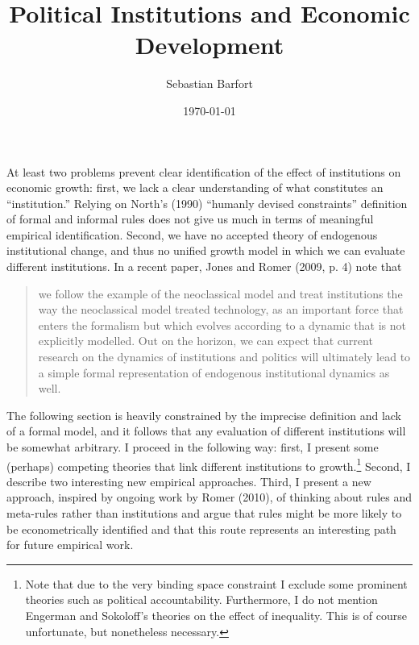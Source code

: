 \documentclass[12pt]{article}%
\begin{document}
\title{Political Institutions and Economic Development }
\author{Sebastian Barfort\medskip\\{\normalsize} \date{\normalsize \today}}
\maketitle

\sloppy




\strut


\thispagestyle{empty}

\pagebreak%

\singlespacing

\section{}
At least two problems prevent clear identification of the effect of institutions on economic growth: first, we lack a clear understanding of what constitutes an ``institution.'' Relying on North's (1990) ``humanly devised constraints'' definition of formal and informal rules does not give us much in terms of meaningful empirical identification. Second, we have no accepted theory of endogenous institutional change, and thus no unified growth model in which we can evaluate different institutions. In a recent paper, Jones and Romer (2009, p. 4) note that 
\begin{quote}
we follow the example of the neoclassical model and treat institutions the way the neoclassical model treated technology, as an important force that enters the formalism but which evolves according to a dynamic that is not explicitly modelled. Out on the horizon, we can expect that current research on the dynamics of institutions and politics will ultimately lead to a simple formal representation of endogenous institutional dynamics as well.
\end{quote}

The following section is heavily constrained by the imprecise definition and lack of a formal model, and it follows that any evaluation of different institutions will be somewhat arbitrary. I proceed in the following way: first, I present some (perhaps) competing theories that link different institutions to growth.\footnote{Note that due to the very binding space constraint I exclude some prominent theories such as political accountability. Furthermore, I do not mention Engerman and Sokoloff's theories on the effect of inequality. This is of course unfortunate, but nonetheless necessary.} Second, I describe two interesting new empirical approaches. Third, I present a new approach, inspired by ongoing work by Romer (2010), of thinking about rules and meta-rules rather than institutions and argue that rules might be more likely to be econometrically identified and that this route represents an interesting path for future empirical work. 
\end{document}
